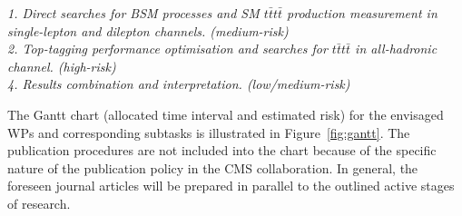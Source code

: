 %
%
%

\noindent\textit{1. Direct searches for BSM processes and SM $t\bar{t}t\bar{t}$ production measurement in single-lepton and dilepton channels. (medium-risk)}\\



\noindent\textit{2. Top-tagging performance optimisation and searches for $t\bar{t}t\bar{t}$ in all-hadronic channel. (high-risk)}\\



\noindent\textit{4. Results combination and interpretation. (low/medium-risk)}\\

\newline


The Gantt chart (allocated time interval and estimated risk) for the envisaged WPs and corresponding subtasks is illustrated in Figure~\ref{fig:gantt}. The publication procedures are not included into the chart because of the specific nature of the publication policy in the CMS collaboration. In general, the foreseen journal articles will be prepared in parallel to the outlined active stages of research.
%